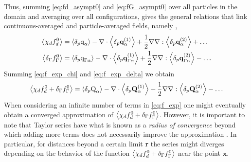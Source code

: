 Thus, summing \ref{eq:fd_asympt0} and \ref{eq:fG_asympt0} over all particles in the domain and averaging over all configurations, gives the general relations that link continuous-averaged and particle-averaged fields, namely \citep{lhuillier1992ensemble,lhuillier1998,lhuillier2000bilan}, 
\begin{align}
    \avg{\chi_df_d^0} 
    &=  \pavg{\text q_\alpha}
        - \div  
        \pavg{\textbf{q}_\alpha^{(1)}}        
        + \frac{1}{2} \grad\grad : \pavg{\textbf{q}_{\alpha}^{(2)}}
        + \ldots  \label{eq:f_exp_chi} \\
    \avg{\delta_\Gamma  f_\Gamma ^0} 
    &=  \pavg{\text q_{\Gamma \alpha}}        
        - \div \pavg{\textbf{q}_{\Gamma\alpha}^{(1)}}
        + \frac{1}{2} \grad\grad : \pavg{\textbf{q}_{\Gamma\alpha}^{(2)}}
        - \ldots  
    \label{eq:f_exp_delta}
\end{align}
Summing \ref{eq:f_exp_chi} and \ref{eq:f_exp_delta} we obtain
\begin{equation}
    \avg{\chi_df_d^0+\delta_\Gamma  f_\Gamma ^0} = \pavg{\text Q_\alpha}
    - \div  
    \pavg{\textbf{Q}_\alpha^{(1)}}        
    + \frac{1}{2} \grad\grad : \pavg{\textbf{Q}_{\alpha}^{(2)}}
    - \ldots  \label{eq:f_exp}
\end{equation}
When considering an infinite number of terms in \ref{eq:f_exp} one might eventually obtain a converged approximation of $\left<\chi_d f_d^0+\delta_\Gamma  f_\Gamma ^0\right>$. 
However, it is important to note that Taylor series have what is known as a \textit{radius of convergence} beyond which adding more terms does not necessarily improve the approximation \citep[Chapter 1]{appel2007}. 
In particular, for distances beyond a certain limit \textbf{r} the series might diverges depending on the behavior of the function $\left<\chi_d f_d^0+\delta_\Gamma  f_\Gamma ^0\right>$ near the point $\textbf{x}$. 

